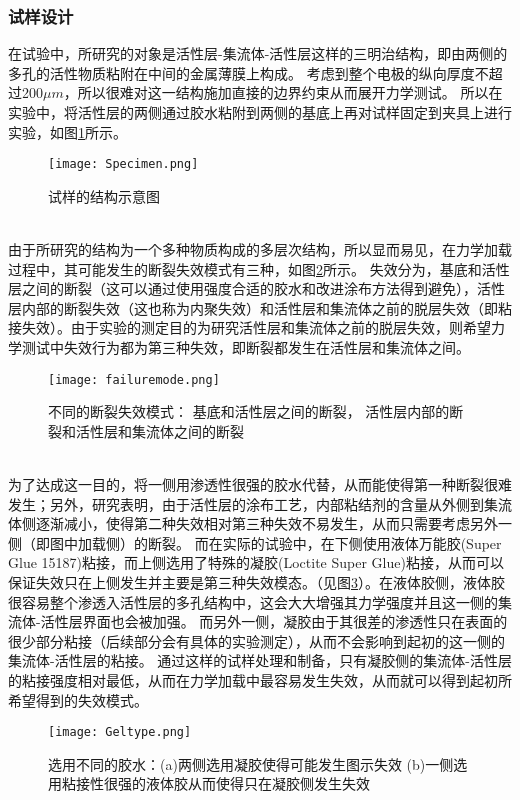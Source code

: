 \subsubsection{试样设计}
在试验中，所研究的对象是活性层-集流体-活性层这样的三明治结构，即由两侧的多孔的活性物质粘附在中间的金属薄膜上构成。 考虑到整个电极的纵向厚度不超过200$\mu m$，所以很难对这一结构施加直接的边界约束从而展开力学测试。 所以在实验中，将活性层的两侧通过胶水粘附到两侧的基底上再对试样固定到夹具上进行实验，如图\ref{fig:specimen}所示。
\begin{figure}
\centering   
\texttt{[image: Specimen.png]}
\caption{试样的结构示意图} 
\label{fig:specimen}
\end{figure}
\\
\indent 由于所研究的结构为一个多种物质构成的多层次结构，所以显而易见，在力学加载过程中，其可能发生的断裂失效模式有三种，如图\ref{fig:mode}所示。 失效分为，基底和活性层之间的断裂（这可以通过使用强度合适的胶水和改进涂布方法得到避免），活性层内部的断裂失效（这也称为内聚失效）和活性层和集流体之前的脱层失效（即粘接失效）。由于实验的测定目的为研究活性层和集流体之前的脱层失效，则希望力学测试中失效行为都为第三种失效，即断裂都发生在活性层和集流体之间。
\begin{figure}
\centering   
\texttt{[image: failuremode.png]}
\caption{不同的断裂失效模式： 基底和活性层之间的断裂， 活性层内部的断裂和活性层和集流体之间的断裂} 
\label{fig:mode}
\end{figure}
\\
\indent 为了达成这一目的，将一侧用渗透性很强的胶水代替，从而能使得第一种断裂很难发生；另外，研究表明，由于活性层的涂布工艺，内部粘结剂的含量从外侧到集流体侧逐渐减小\cite{M2017Investigation}，使得第二种失效相对第三种失效不易发生，从而只需要考虑另外一侧（即图中加载侧）的断裂。 而在实际的试验中，在下侧使用液体万能胶(Super Glue 15187)粘接，而上侧选用了特殊的凝胶(Loctite Super Glue)粘接，从而可以保证失效只在上侧发生并主要是第三种失效模态。（见图\ref{fig:geltype}）。在液体胶侧，液体胶很容易整个渗透入活性层的多孔结构中，这会大大增强其力学强度并且这一侧的集流体-活性层界面也会被加强。 而另外一侧，凝胶由于其很差的渗透性只在表面的很少部分粘接（后续部分会有具体的实验测定），从而不会影响到起初的这一侧的集流体-活性层的粘接。 通过这样的试样处理和制备，只有凝胶侧的集流体-活性层的粘接强度相对最低，从而在力学加载中最容易发生失效，从而就可以得到起初所希望得到的失效模式。
\begin{figure}
\centering   
\texttt{[image: Geltype.png]}
\caption{选用不同的胶水：(a)两侧选用凝胶使得可能发生图示失效 (b)一侧选用粘接性很强的液体胶从而使得只在凝胶侧发生失效} 
\label{fig:geltype}
\end{figure}
